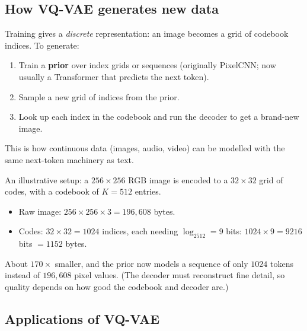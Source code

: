 \documentclass[11pt,a4paper]{article}
\begin{document}
\subsection{How VQ-VAE generates new data}

Training gives a \emph{discrete} representation: an image becomes a grid of codebook indices. To generate:
\begin{enumerate}[nosep]
\item Train a \textbf{prior} over index grids or sequences (originally PixelCNN; now usually a Transformer that predicts the next token).
\item Sample a new grid of indices from the prior.
\item Look up each index in the codebook and run the decoder to get a brand-new image.
\end{enumerate}
This is how continuous data (images, audio, video) can be modelled with the same next-token machinery as text.

\begin{example}
An illustrative setup: a $256\times256$ RGB image is encoded to a $32\times32$ grid of codes, with a codebook of $K=512$ entries.
\begin{itemize}[nosep]
\item Raw image: $256\times256\times3=196{,}608$ bytes.
\item Codes: $32\times32=1024$ indices, each needing $\log_2512=9$ bits: $1024\times9=9216$ bits $=1152$ bytes.
\end{itemize}
About $170\times$ smaller, and the prior now models a sequence of only $1024$ tokens instead of $196{,}608$ pixel values. (The decoder must reconstruct fine detail, so quality depends on how good the codebook and decoder are.)
\end{example}

\subsection{Applications of VQ-VAE}
\end{document}
